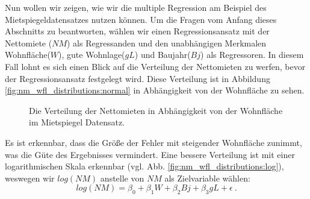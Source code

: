 Nun wollen wir zeigen, wie wir die multiple Regression am Beispiel des Mietspiegeldatensatzes nutzen können.
Um die Fragen vom Anfang dieses Abschnitts zu beantworten, wählen wir einen Regressionsansatz mit der Nettomiete ($NM$) als Regressanden und den unabhängigen Merkmalen Wohnfläche($W$), gute Wohnlage($gL$) und Baujahr($Bj$) als Regressoren.
In diesem Fall lohnt es sich einen Blick auf die Verteilung der Nettomieten zu werfen, bevor der Regressionsansatz festgelegt wird.
Diese Verteilung ist in Abbildung \ref{fig:nm_wfl_distributions:normal} in Abhängigkeit von der Wohnfläche zu sehen.
\begin{figure}[t]
  \centering
  \begin{narrow}{-0.2\textwidth}{0.2\textwidth}
   
  \end{narrow}
  \caption{Die Verteilung der Nettomieten in Abhängigkeit von der Wohnfläche im Mietspiegel Datensatz.}
  \label{fig:nm_wfl_distributions}
\end{figure}
Es ist erkennbar, dass die Größe der Fehler mit steigender Wohnfläche zunimmt, was die Güte des Ergebnisses vermindert.
Eine bessere Verteilung ist mit einer logarithmischen Skala erkennbar (vgl. Abb. \ref{fig:nm_wfl_distributions:log}), weswegen wir $log(NM)$ anstelle von $NM$ als Zielvariable wählen:
\begin{equation*}
 log(NM) = \beta_0 + \beta_1 W + \beta_2 Bj + \beta_3 gL + \epsilon ~.
\end{equation*}

